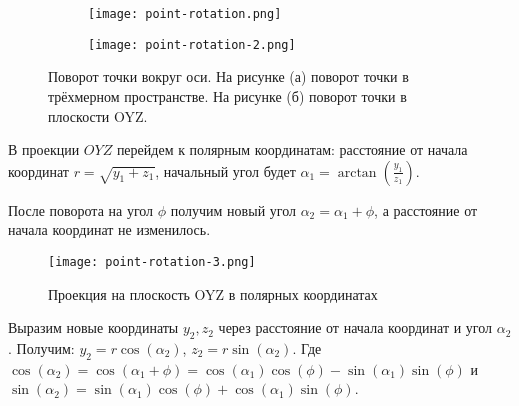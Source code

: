 \begin{figure}[ht]
    \centering
    \hspace*{\fill}%
    \begin{subfigure}[b]{0.49\textwidth}
        \texttt{[image: point-rotation.png]}
        \caption{}
        \label{fig:point-rot-1}
    \end{subfigure}
    \begin{subfigure}[b]{0.49\textwidth}
        \texttt{[image: point-rotation-2.png]}
        \caption{}
        \label{fig:point-rot-2}
    \end{subfigure}
    \caption{Поворот точки вокруг оси. На рисунке (а) поворот точки в трёхмерном пространстве.
    На рисунке (б) поворот точки в плоскости OYZ.}
    \label{fig:point-rot}
\end{figure}

В проекции \(OYZ\) перейдем к полярным координатам: расстояние от начала координат \(r=\sqrt{y_1+z_1}\), начальный угол будет
 \(\alpha_1=\arctan(\frac{y_1}{z_1})\).

После поворота на угол \(\phi\) получим новый угол \(\alpha_2=\alpha_1+\phi\), а расстояние от начала координат не изменилось.

\begin{figure}[ht]
    \centering
    \texttt{[image: point-rotation-3.png]}
    \caption{Проекция на плоскость OYZ в полярных координатах}
    \label{fig:point-rot-3}
\end{figure}

Выразим новые координаты \(y_2, z_2\) через расстояние от начала координат и угол \(\alpha_2\).
Получим: \(y_2=r\cos(\alpha_2)\), \(z_2=r\sin(\alpha_2)\). Где \(\cos(\alpha_2)=\cos(\alpha_1+\phi)=\cos(\alpha_1)\cos(\phi)-\sin(\alpha_1)\sin(\phi)\) и \(\sin(\alpha_2)=\sin(\alpha_1)\cos(\phi)+\cos(\alpha_1)\sin(\phi)\).

